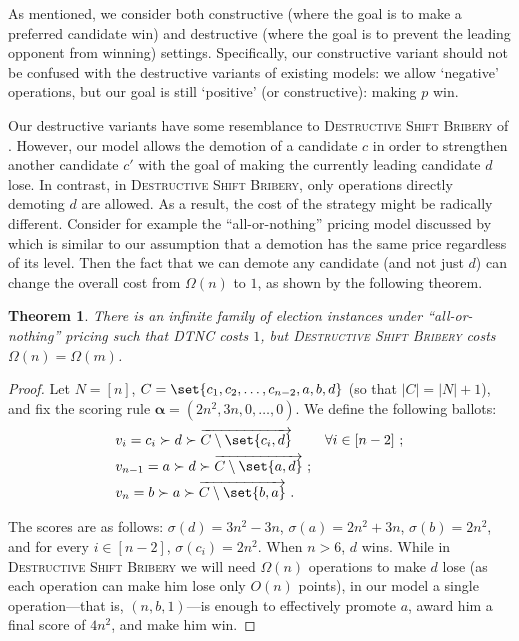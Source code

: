 \documentclass[letterpaper]{article} %
\newtheorem{theorem}{Theorem}
\newcommand{\vecgreek}{\bm}
\newcommand{\veca}{\vecgreek{\alpha}}
\newcommand{\DTNC}{\textsc{DTNC}}
\newcommand{\shiftB}{\textsc{Shift Bribery}}
\newcommand{\DshiftB}{\textsc{Destructive} \shiftB{}}
\newcommand{\ora}[1]{\overrightarrow{#1}}
\newcommand{\abs}[1]{\lvert{#1}\rvert}
\begin{document}
As mentioned, we consider both constructive (where the goal is to make a preferred candidate win) and destructive (where the goal is to prevent the leading opponent from winning) settings. Specifically,  our constructive variant should not be confused with the destructive variants of existing models: we allow `negative' operations, but our goal is still `positive' (or constructive): making $p$ win.

Our destructive variants have some resemblance to \DshiftB{} of \citet{Kaczmarczyk2019destructive}. However, our model allows the demotion of a candidate $c$ in order to strengthen another candidate $c'$ with the goal of making the currently leading candidate $d$ lose. In contrast, in \DshiftB, only operations directly demoting $d$ are allowed. As a result, the cost of the strategy might be radically different. Consider for example the ``all-or-nothing'' pricing model discussed by \citet{Kaczmarczyk2019destructive} which is similar to our assumption that a demotion has the same price regardless of its level. Then the fact that we can demote any candidate (and not just $d$) can change the overall cost from $\Omega(n)$ to $1$, as shown by the following theorem.
\begin{theorem} There is an infinite family of election instances under ``all-or-nothing'' pricing   such that \DTNC{} costs $1$, but
\DshiftB{} costs $\Omega(n)=\Omega(m)$.
\end{theorem}
\begin{proof}
Let $N = [n]$, $C = \set{c_1, c_2, \dots, c_{n-2}, a,b, d}$    (so that $\abs{C} = \abs{N}+1 $), and fix the  scoring rule $\veca=(2n^2, 3n,0,\ldots,0)$. We define the following ballots:
\begin{align*}
&v_i = c_i \succ d \succ \ora{C\setminus \set{c_i, d}} &\forall i \in  [n-2]\ ;\\
&v_{n-1} = a \succ d \succ \ora{C\setminus \set{a, d}}\ ;\\
&v_{n} = b \succ a \succ \ora{C\setminus \set{b,a}}\ .
\end{align*}

The scores are as follows: $\sigma(d) = 3n^2 -3n$, $\sigma(a) = 2n^2 + 3n$, $\sigma(b) = 2n^2$,  and for every $i \in  [n-2]$, $\sigma(c_i) = 2n^2$. When $n > 6$, $d$ wins. While in \DshiftB{} we will need $\Omega(n)$ operations to make $d$ lose (as each operation can make him lose only $O(n)$ points), in our model a single operation---that is, $(n, b, 1)$---is enough to effectively promote $a$, award him a final score of $4n^2$, and make him win.
\end{proof}
\end{document}
